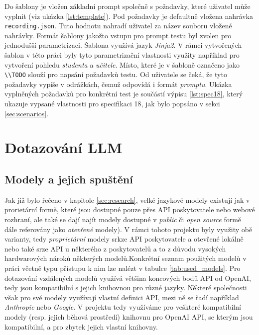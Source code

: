 \documentclass[czech, ma, kiv, he, iso690alph, pdf, viewonly]{fasthesis}
\begin{document}
            Do šablony je vložen základní prompt společně s požadavky, které uživatel může vyplnit (viz ukázka \ref{lst:template}). Pod požadavky je defaultně vložena nahrávka \verb|recording.json|. Tuto hodnotu nahradí uživatel za název souboru vložené nahrávky. Formát šablony jakožto vstupu pro prompt testu byl zvolen pro jednodušší parametrizaci. Šablona využívá jazyk \emph{Jinja2}. V rámci vytvořených šablon v této práci byly tyto parametrizační vlastnosti využity například pro vytvoření pohledu \textit{studenta} a \textit{učitele}. Místo, které je v šabloně označeno jako \verb|\\TODO| slouží pro napsání požadavků testu. Od uživatele se čeká, že tyto požadavky vypíše v odrážkách, čemuž odpovídá i formát \emph{promptu}. Ukázka vyplněných požadavků pro konkrétní test je součástí výpisu \ref{lst:spec18}, který ukazuje vypsané vlastnosti pro specifikaci 18, jak bylo popsáno v sekci \ref{sec:scenarios}.


    \section{Dotazování LLM}

        \subsection{Modely a jejich spuštění}
            
            Jak již bylo řečeno v kapitole \ref{sec:research}, velké jazykové modely existují jak v prorietární formě, které jsou dostupné pouze přes API poskytovatele nebo webové rozhraní, ale také se dají najít modely dostupné v \textit{public} či \textit{open source} formě dále referovány jako \emph{otevřené} modely). V rámci tohoto projektu byly využity obě varianty, tedy \emph{proprietární} modely srkze API poskytovatele a otevřené lokálně nebo také srze API u některého z poskytovatelů a to z důvodu vysokých hardwarových nároků některých modelů.Konkrétní seznam použitých modelů v práci včetně typu přístupu k nim lze nalézt v tabulce \ref{tab:used_models}. Pro dotazování vzdálených modelů využívá většina koncových bodů API od OpenAI, tedy jsou kompatibilní s jejich knihovnou pro různé jazyky. Některé společnosti však pro své modely využívají vlastní definici API, mezi ně se řadí například \textit{Anthropic} nebo \textit{Google}. V projektu tedy využíváme pro veškteré kompatibilní modely (resp. jejich běhová prostředí) knihovnu pro OpenAI API, se kterým jsou kompatibilní, a pro zbytek jejich vlastní knihovny.
\end{document}
